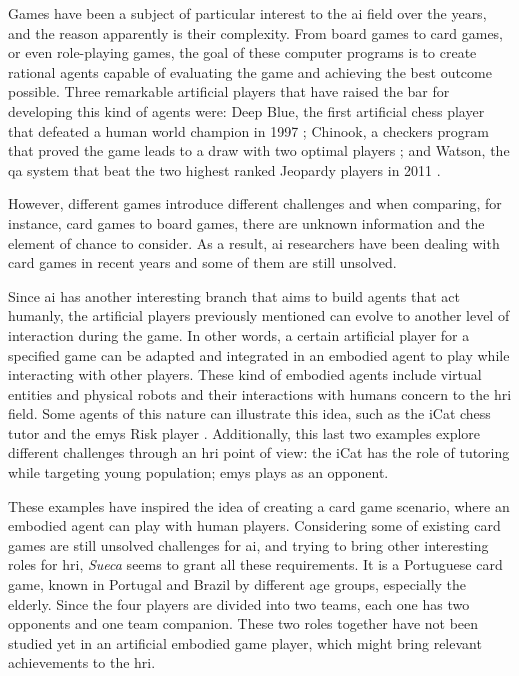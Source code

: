 \label{sec:introduction}

Games have been a subject of particular interest to the \ac{ai} field over the years, and the reason apparently is their complexity.
From board games to card games, or even role-playing games, the goal of these computer programs is to create rational agents capable of evaluating the game and achieving the best outcome possible.
Three remarkable artificial players that have raised the bar for developing this kind of agents were: Deep Blue, the first artificial chess player that defeated a human world champion in 1997 \cite{Campbell2002}; Chinook, a checkers program that proved the game leads to a draw with two optimal players \cite{Schaeffer1996}; and Watson, the \ac{qa} system that beat the two highest ranked Jeopardy players in 2011 \cite{Ferrucci2010}.

However, different games introduce different challenges and when comparing, for instance, card games to board games, there are unknown information and the element of chance to consider.
As a result, \ac{ai} researchers have been dealing with card games in recent years and some of them are still unsolved.

Since \ac{ai} has another interesting branch that aims to build agents that act humanly, the artificial players previously mentioned can evolve to another level of interaction during the game.
In other words, a certain artificial player for a specified game can be adapted and integrated in an embodied agent to play while interacting with other players.
These kind of embodied agents include virtual entities and physical robots and their interactions with humans concern to the \ac{hri} field.
Some agents of this nature can illustrate this idea, such as the iCat chess tutor \cite{Affective2007} and the \ac{emys} Risk player \cite{Pereira}.
Additionally, this last two examples explore different challenges through an \ac{hri} point of view: the iCat has the role of tutoring while targeting young population; \ac{emys} plays as an opponent.

These examples have inspired the idea of creating a card game scenario, where an embodied agent can play with human players.
Considering some of existing card games are still unsolved challenges for \ac{ai}, and trying to bring other interesting roles for \ac{hri}, \emph{Sueca} seems to grant all these requirements.
It is a Portuguese card game, known in Portugal and Brazil by different age groups, especially the elderly.
Since the four players are divided into two teams, each one has two opponents and one team companion.
These two roles together have not been studied yet in an artificial embodied game player, which might bring relevant achievements to the \ac{hri}.

